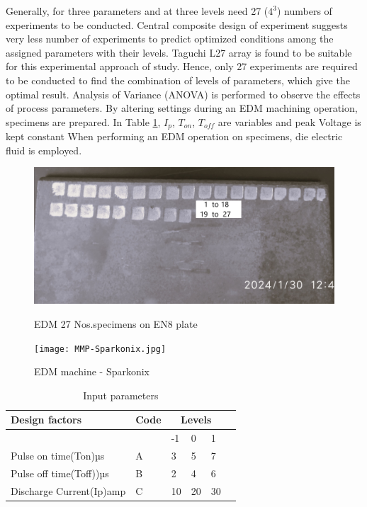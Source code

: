 \documentclass[suppldata]{interact}
\begin{document}
 Generally, for three parameters and at three levels need 27 ($4^3$) numbers of experiments to be conducted.  Central composite design of experiment suggests very less number of experiments to predict optimized conditions among the assigned parameters with their levels.  Taguchi L27 array is found to be suitable for this experimental approach of study. Hence, only 27 experiments are required to be conducted to find the combination of levels of parameters, which give the optimal result. Analysis of Variance (ANOVA) is performed to observe the effects of process parameters.	By altering settings during an EDM machining operation, specimens are prepared. In Table \ref{tab:input}, $I_p$, $T_{on}$, $T_{off}$ are variables and peak Voltage is kept constant When performing an EDM operation on specimens, die electric fluid is employed.
  \begin{figure}[htbp]
          \begin{minipage}{0.5\textwidth}
        \centering
        \includegraphics[width= 0.5\linewidth]{MMP-27 No -EDM-speciemans.jpg}
        \caption{EDM 27 Nos.specimens on EN8 plate}
        \label{fig:speciman}
      \end{minipage} 
    \begin{minipage}{0.4\textwidth}
        \texttt{[image: MMP-Sparkonix.jpg]}
            \caption{EDM machine - Sparkonix}
            \label{fig:sparkonix}
   \end{minipage}
  \end{figure}
 \begin{table}[htbp] 
     \begin{minipage}{0.4\textwidth}
     \centering
    \caption{Input parameters}
     \begin{tabular}{|l|l|l|l|l|l|}	
       \hline
		Design factors & Code & \multicolumn{3}{c|}{Levels} \\ 	\hline
		~ & ~ & -1 & 0 &1 \\ \hline
		Pulse on time(Ton)µs & A & 3 & 5 & 7 \\ \hline
		Pulse off time(Toff))µs & B & 2 & 4 & 6 \\ \hline
		Discharge Current(Ip)amp & C & 10 & 20 & 30 \\ \hline
       \end{tabular}
       \label{tab:input}
       \end{minipage}
 \end{table}  
\end{document}
